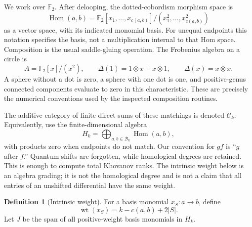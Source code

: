 \documentclass[11pt,letterpaper]{article}
\theoremstyle{definition}
\newtheorem{definition}[theorem]{Definition}
\theoremstyle{remark}
\newcommand{\F}{\mathbb F_2}
\newcommand{\C}{\mathcal C}
\newcommand{\B}{\mathcal B}
\newcommand{\Hom}{\operatorname{Hom}}
\newcommand{\wt}{\operatorname{wt}}
\begin{document}
We work over $\F$. After delooping, the dotted-cobordism morphism space is
\begin{equation}\label{eq:hom}
 \Hom(a,b)=\F[x_1,\ldots,x_{c(a,b)}]/(x_1^2,\ldots,x_{c(a,b)}^2)
\end{equation}
as a vector space, with its indicated monomial basis. For unequal endpoints
this notation specifies the basis, not a multiplication internal to that Hom
space. Composition is the usual saddle-gluing operation. The Frobenius algebra
on a circle is
\begin{equation}\label{eq:frob}
 A=\F[x]/(x^2),\qquad
 \Delta(1)=1\otimes x+x\otimes1,\qquad \Delta(x)=x\otimes x.
\end{equation}
A sphere without a dot is zero, a sphere with one dot is one, and positive-genus
connected components evaluate to zero in this characteristic. These are precisely
the numerical conventions used by the inspected composition routines.

The additive category of finite direct sums of these matchings is denoted
$\C_k$. Equivalently, use the finite-dimensional algebra
\[
 H_k=\bigoplus_{a,b\in\B_k}\Hom(a,b),
\]
with products zero when endpoints do not match. Our convention for $gf$ is
``$g$ after $f$.'' Quantum shifts are forgotten, while homological degrees are
retained. This is enough to compute total Khovanov ranks. The intrinsic weight
below is an algebra grading; it is not the homological degree and is not a
claim that all entries of an unshifted differential have the same weight.

\begin{definition}[Intrinsic weight]
For a basis monomial $x_S:a\to b$, define
\begin{equation}\label{eq:weight}
 \wt(x_S)=k-c(a,b)+2|S|.
\end{equation}
Let $J$ be the span of all positive-weight basis monomials in $H_k$.
\end{definition}
\end{document}
